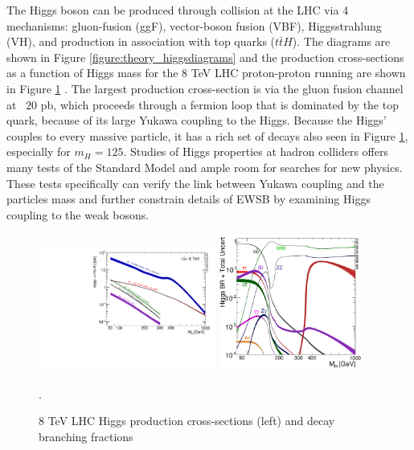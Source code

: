 The Higgs boson can be produced through collision at the LHC
via 4 mechanisms: gluon-fusion (ggF), vector-boson fusion (VBF), 
Higgsstrahlung (VH), and production in association with top quarks ($t\bar{t}H$). The diagrams
are shown in Figure \ref{figure:theory_higgsdiagrams} and the production
cross-sections as a function of Higgs mass for the 8 TeV LHC proton-proton
running are shown in Figure \ref{figure:theory_xsec} \cite{Dittmaier:2012vm}. The largest production
cross-section is via the gluon fusion channel at ~$20$ pb, which proceeds
through a fermion loop that is dominated by the top quark, because of its
large Yukawa coupling to the Higgs. Because the Higgs' couples to every massive
particle, it has a rich set of decays also seen in Figure
\ref{figure:theory_xsec}, especially for $m_H=125$.  Studies of Higgs
properties at hadron colliders offers many tests of the Standard Model
and ample room for searches for new physics. These
tests specifically can verify the link between Yukawa coupling and the
particles mass and further constrain details of EWSB by examining Higgs coupling
to the weak bosons. 

\begin{figure}[!t]
\centering 
\includegraphics[width=0.52\textwidth]{figs/theory/Higgs_XS_8TeV_lx.pdf}
\includegraphics[width=0.42\textwidth]{figs/theory/Higgs_BR.pdf}
\caption {8 TeV LHC Higgs production cross-sections (left) and decay branching fractions }.
\label{figure:theory_xsec}
\end{figure}


